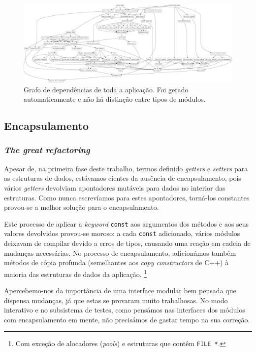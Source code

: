 \documentclass[11pt, a4paper]{article}
\begin{document}
\begin{figure}[ht]
    \centering
    \includegraphics[scale=0.09]{res-fase2/global_dependencies.png}
    \caption{Grafo de dependências de toda a aplicação. Foi gerado automaticamente e não há
             distinção entre tipos de módulos.}
    \label{fig:global-dependencies}
\end{figure}

\subsection{Encapsulamento}
\label{sec:encapsulation}

\subsubsection{\emph{The great refactoring}}
\label{sec:the-great-refactoring}

Apesar de, na primeira fase deste trabalho, termos definido \emph{getters} e \emph{setters} para as
estruturas de dados, estávamos cientes da ausência de encapsulamento, pois vários \emph{getters}
devolviam apontadores mutáveis para dados no interior das estruturas. Como nunca escrevíamos para
estes apontadores, torná-los constantes provou-se a melhor solução para o encapsulamento.

Este processo de aplicar a \emph{keyword} \texttt{const} aos argumentos dos métodos e aos seus
valores devolvidos provou-se moroso: a cada \texttt{const} adicionado, vários módulos deixavam de
compilar devido a erros de tipos, causando uma reação em cadeia de mudanças necessárias. No processo
de encapsulamento, adicionámos também métodos de cópia profunda (semelhantes aos \emph{copy
constructors} de C++) à maioria das estruturas de dados da aplicação. \footnote{Com exceção de
alocadores (\emph{pools}) e estruturas que contêm \texttt{FILE *}.}

Apercebemo-nos da importância de uma interface modular bem pensada que dispensa mudanças, já que
estas se provaram muito trabalhosas. No modo interativo e no subsistema de testes, como pensámos nas
interfaces dos módulos com encapsulamento em mente, não precisámos de gastar tempo na sua correção.
\end{document}
